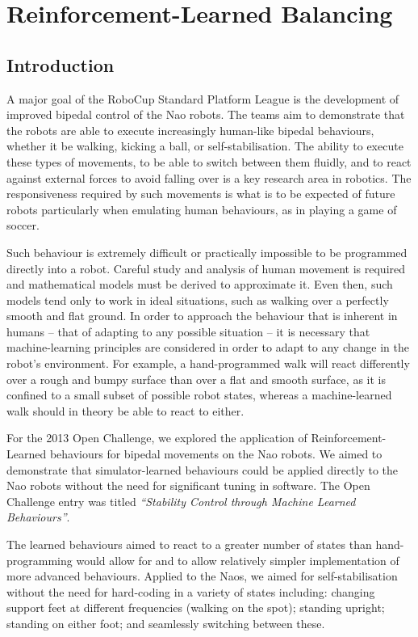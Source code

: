 \chapter{Reinforcement-Learned Balancing}
\label{chap:rl_walk}

\section{Introduction}

A major goal of the RoboCup Standard Platform League is the development of improved bipedal control of the Nao robots. The teams aim to demonstrate that the robots are able to execute increasingly human-like bipedal behaviours, whether it be walking, kicking a ball, or self-stabilisation. The ability to execute these types of movements, to be able to switch between them fluidly, and to react against external forces to avoid falling over is a key research area in robotics. The responsiveness required by such movements is what is to be expected of future robots particularly when emulating human behaviours, as in playing a game of soccer.

Such behaviour is extremely difficult or practically impossible to be programmed directly into a robot. Careful study and analysis of human movement is required and mathematical models must be derived to approximate it. Even then, such models tend only to work in ideal situations, such as walking over a perfectly smooth and flat ground. In order to approach the behaviour that is inherent in humans -- that of adapting to any possible situation -- it is necessary that machine-learning principles are considered in order to adapt to any change in the robot's environment. For example, a hand-programmed walk will react differently over a rough and bumpy surface than over a flat and smooth surface, as it is confined to a small subset of possible robot states, whereas a machine-learned walk should in theory be able to react to either.

For the 2013 Open Challenge, we explored the application of Reinforcement-Learned behaviours for bipedal movements on the Nao robots. We aimed to demonstrate that simulator-learned behaviours could be applied directly to the Nao robots without the need for significant tuning in software. The Open Challenge entry was titled \textit{``Stability Control through Machine Learned Behaviours''}\cite{openchallenge}.

The learned behaviours aimed to react to a greater number of states than hand-programming would allow for and to allow relatively simpler implementation of more advanced behaviours. Applied to the Naos, we aimed for self-stabilisation without the need for hard-coding in a variety of states including: changing support feet at different frequencies (walking on the spot); standing upright; standing on either foot; and seamlessly switching between these. 

